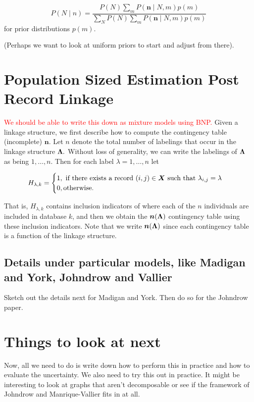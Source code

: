 \documentclass[twoside]{article}
\newcommand{\n}{\boldsymbol{n}}
\begin{document}
$$P(N \mid n)  = \frac{ P(N) \sum_m P(\n \mid N, m) p(m)  }
{\sum_N P(N) \sum_m P(\n \mid N, m) p(m)} $$
for prior distributions $p(m).$ 

(Perhaps we want to look at uniform priors to start and adjust from there). 

\section{Population Sized Estimation Post Record Linkage}

\textcolor{red}{We should be able to write this down as mixture models using BNP.} 
Given a linkage structure, we first describe how to compute the contingency table (incomplete) $\n.$ Let $n$ denote the total number of labelings that occur in the linkage structure $\boldsymbol{\Lambda}.$ Without loss of generality, we can write the labelings of $\boldsymbol{\Lambda}$ as being $1,\ldots,n.$ Then for each label
$\lambda = 1,\ldots,n$ let 

$$
H_{\lambda,k} =
\begin{cases}
1, \text{ if there exists a record $(i,j) \in \bm{X}$ such that $\lambda_{i,j} = \lambda$} \\
0, \text{otherwise}. \\
\end{cases}
$$

That is, $H_{\lambda,k}$ contains inclusion indicators of where each of the $n$ individuals are included in database $k$, and then we obtain the $\n(\lam)$ contingency table using these inclusion indicators. Note that we write $\n(\lam)$ since each contingency table is a function of the linkage structure.



\subsection{Details under particular models, like Madigan and York, Johndrow and Vallier} 
Sketch out the details next for Madigan and York.
Then do so for the Johndrow paper. 

\section{Things to look at next}

Now, all we need to do is write down how to perform this in practice and how to evaluate the uncertainty. We also need to try this out in practice. 
It might be interesting to look at graphs that aren't decomposable or see if the framework of Johndrow and Manrique-Vallier fits in at all. 
\end{document}
